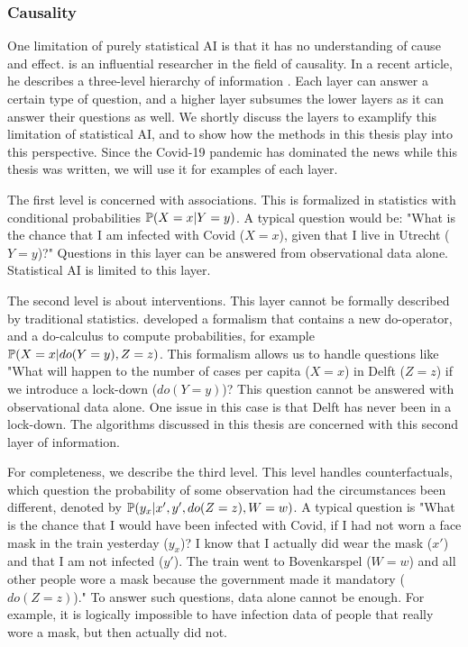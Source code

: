 \subsubsection{Causality}

One limitation of purely statistical AI is that it has no understanding of cause and effect. \citet{pearl2009causality} is an influential researcher in the field of causality. In a recent article, he describes a three-level hierarchy of information \citep{pearl2019seven}. Each layer can answer a certain type of question, and a higher layer subsumes the lower layers as it can answer their questions as well. We shortly discuss the layers to examplify this limitation of statistical AI, and to show how the methods in this thesis play into this perspective. Since the Covid-19 pandemic has dominated the news while this thesis was written, we will use it for examples of each layer.

The first level is concerned with associations. This is formalized in statistics with conditional probabilities $\mathbb{P}(X=x|Y=y)$. A typical question would be: "What is the chance that I am infected with Covid ($X=x$), given that I live in Utrecht ($Y=y$)?" Questions in this layer can be answered from observational data alone. Statistical AI is limited to this layer.

The second level is about interventions. This layer cannot be formally described by traditional statistics. \citet{pearl2009causality} developed a formalism that contains a new do-operator, and a do-calculus to compute probabilities, for example $\mathbb{P}(X=x|do(Y=y),Z=z)$. This formalism allows us to handle questions like "What will happen to the number of cases per capita ($X=x$) in Delft ($Z=z$) if we introduce a lock-down ($do(Y=y)$)? This question cannot be answered with observational data alone. One issue in this case is that Delft has never been in a lock-down. The algorithms discussed in this thesis are concerned with this second layer of information.

For completeness, we describe the third level. This level handles counterfactuals, which question the probability of some observation had the circumstances been different, denoted by $\mathbb{P}(y_x|x',y',do(Z=z),W=w)$. A typical question is "What is the chance that I would have been infected with Covid, if I had not worn a face mask in the train yesterday ($y_x$)? I know that I actually did wear the mask ($x'$) and that I am not infected ($y'$). The train went to Bovenkarspel ($W=w$) and all other people wore a mask because the government made it mandatory ($do(Z=z)$)." To answer such questions, data alone cannot be enough. For example, it is logically impossible to have infection data of people that really wore a mask, but then actually did not. 


